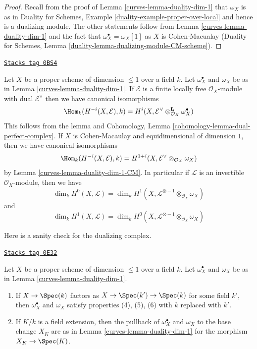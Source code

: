 \begin{proof}

Recall from the proof of Lemma \ref{curves-lemma-duality-dim-1}
that $\omega_X$ is as in Duality for Schemes, Example
\ref{duality-example-proper-over-local} and hence is
a dualizing module. The other statements follow from
Lemma \ref{curves-lemma-duality-dim-1}
and the fact that $\omega_X^\bullet = \omega_X[1]$
as $X$ is Cohen-Macualay (Duality for Schemes, Lemma
\ref{duality-lemma-dualizing-module-CM-scheme}).
\end{proof}

\begin{remark}
\label{curves-remark-rework-duality-locally-free}
\href{https://stacks.math.columbia.edu/tag/0BS4}{\texttt{Stacks tag 0BS4}}

Let $X$ be a proper scheme of dimension $\leq 1$ over a field $k$.
Let $\omega_X^\bullet$ and $\omega_X$ be as in Lemma \ref{curves-lemma-duality-dim-1}.
If $\mathcal{E}$ is a finite locally free $\mathcal{O}_X$-module
with dual $\mathcal{E}^\vee$ then we have canonical isomorphisms
$$
\Hom_k(H^{-i}(X, \mathcal{E}), k) =
H^i(X, \mathcal{E}^\vee \otimes_{\mathcal{O}_X}^\mathbf{L} \omega_X^\bullet)
$$
This follows from the lemma and
Cohomology, Lemma \ref{cohomology-lemma-dual-perfect-complex}.
If $X$ is Cohen-Macaulay and equidimensional of dimension $1$, then
we have canonical isomorphisms
$$
\Hom_k(H^{-i}(X, \mathcal{E}), k) =
H^{1 + i}(X, \mathcal{E}^\vee \otimes_{\mathcal{O}_X} \omega_X)
$$
by Lemma \ref{curves-lemma-duality-dim-1-CM}. In particular
if $\mathcal{L}$ is an invertible $\mathcal{O}_X$-module, then we have
$$
\dim_k H^0(X, \mathcal{L}) =
\dim_k H^1(X, \mathcal{L}^{\otimes -1} \otimes_{\mathcal{O}_X} \omega_X)
$$
and
$$
\dim_k H^1(X, \mathcal{L}) =
\dim_k H^0(X, \mathcal{L}^{\otimes -1} \otimes_{\mathcal{O}_X} \omega_X)
$$
\end{remark}

Here is a sanity check for the dualizing complex.

\begin{lemma}
\label{curves-lemma-sanity-check-duality}
\href{https://stacks.math.columbia.edu/tag/0E32}{\texttt{Stacks tag 0E32}}

Let $X$ be a proper scheme of dimension $\leq 1$ over a field $k$.
Let $\omega_X^\bullet$ and $\omega_X$ be as in Lemma \ref{curves-lemma-duality-dim-1}.
\begin{enumerate}
\item If $X \to \Spec(k)$ factors as $X \to \Spec(k') \to \Spec(k)$
for some field $k'$, then $\omega_X^\bullet$ and $\omega_X$
satisfy properties (4), (5), (6) with $k$ replaced with $k'$.
\item If $K/k$ is a field extension, then the pullback of
$\omega_X^\bullet$ and $\omega_X$ to the base change $X_K$
are as in  Lemma \ref{curves-lemma-duality-dim-1} for the morphism
$X_K \to \Spec(K)$.
\end{enumerate}
\end{lemma}

